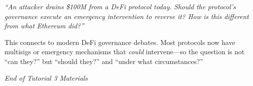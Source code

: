 \documentclass[11pt]{article}
\begin{document}
\textit{``An attacker drains \$100M from a DeFi protocol today. Should the protocol's governance execute an emergency intervention to reverse it? How is this different from what Ethereum did?''}

\medskip
This connects to modern DeFi governance debates. Most protocols now have multisigs or emergency mechanisms that \textit{could} intervene---so the question is not ``can they?'' but ``should they?'' and ``under what circumstances?''

\vfill
\begin{flushright}
\textit{End of Tutorial 3 Materials}
\end{flushright}
\end{document}

